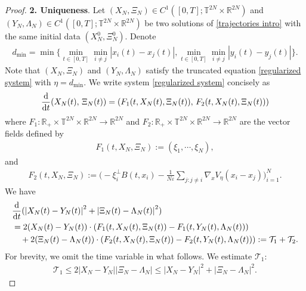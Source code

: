 \documentclass[11pt,reqno]{amsart}
\numberwithin{equation}{section}
\def\dd{{\rm d}}
\begin{document}
\begin{proof}
\smallskip
\textbf{2. Uniqueness}. Let $(X_{N},\Xi_{N})\in C^{1}([0,T];\mathbb{T}^{2N}\times \mathbb{R}^{2N})$ and $(Y_{N},\Lambda_{N})\in C^{1}([0,T];\mathbb{T}^{2N}\times \mathbb{R}^{2N})$ be two solutions of \eqref{trajectories intro} with the same initial data $(X_{N}^{0},\Xi_{N}^{0})$. Denote 
\begin{align*}
d_{\min}=\min\Big\{\underset{t\in [0,T]}{\min}\underset{i\neq j}{\min}\left\vert x_{i}(t)-x_{j}(t)\right\vert,\underset{t\in[0,T]}{\min}\min_{i\neq j} \left\vert y_{i}(t)-y_{j}(t)\right\vert\Big\}.     
\end{align*}
Note that $(X_{N},\Xi_{N})$ and $(Y_{N},\Lambda_{N})$ satisfy the truncated equation \eqref{regularized system} with $\eta=d_{\min}$. 
We write system \eqref{regularized system} concisely as 
\begin{align*}
\frac{\dd}{\dd t}(X_{N}(t),\,\Xi_{N}(t))
=(F_{1}(t,X_{N}(t),\Xi_{N}(t)),\,F_{2}(t,X_{N}(t),\Xi_{N}(t)))  \end{align*}
where $F_{1}:\mathbb{R}_{+}\times \mathbb{T}^{2N}\times \mathbb{R}^{2N}\rightarrow \mathbb{R}^{2N}$ and $F_{2}:\mathbb{R}_{+}\times \mathbb{T}^{2N}\times \mathbb{R}^{2N}\rightarrow \mathbb{R}
^{2N}$ are the vector fields defined by 
\begin{align*}
F_{1}(t,X_{N},\Xi_{N}):= (\xi_{1},\cdots\!,\xi_{N}),    
\end{align*}
and 
\begin{align*}
F_{2}(t,X_{N},\Xi_{N}):=\Big(-\xi_{i}^{\perp}B(t,x_{i})-\frac{1}{N\varepsilon}\sum_{j:j\neq i}\nabla_{x}V_{\eta}(x_{i}-x_{j})\Big)_{i=1}^{N}.
\end{align*}
We have 
\begin{align*}
&\frac{\dd}{\dd t}(\left\vert X_{N}(t)-Y_{N}(t)\right\vert^{2}+\left\vert \Xi_{N}(t)-\Lambda_{N}(t)\right\vert^{2})\\
&=2(X_{N}(t)-Y_{N}(t))\cdot (F_{1}(t,X_{N}(t),\Xi_{N}(t))-F_{1}(t,Y_{N}(t),\Lambda_{N}(t)))\\
&\quad+2(\Xi_{N}(t)-\Lambda_{N}(t))\cdot (F_{2}(t,X_{N}(t),\Xi_{N}(t))-F_{2}(t,Y_{N}(t),\Lambda_{N}(t))):= \mathcal{T}_{1}+\mathcal{T}_{2}.    \end{align*}
For brevity, we omit the time variable in what follows. We estimate $\mathcal{T}_{1}$:\begin{align}
\mathcal{T}_{1}\leq 2\left\vert X_{N}-Y_{N}\right\vert\left\vert \Xi_{N}-\Lambda_{N}\right\vert\leq \left\vert X_{N}-Y_{N}\right\vert^{2}+\left\vert \Xi_{N}-\Lambda_{N}\right\vert^{2}.  \label{T1 estimate}        
\end{align}

\end{proof}
\end{document}
